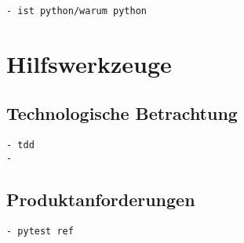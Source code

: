\begin{verbatim}
- ist python/warum python
\end{verbatim}


\section{Hilfswerkzeuge}
\subsection{Technologische Betrachtung}
\begin{verbatim}
- tdd
- 
\end{verbatim}
\subsection{Produktanforderungen}
\begin{verbatim}
- pytest ref
\end{verbatim}
